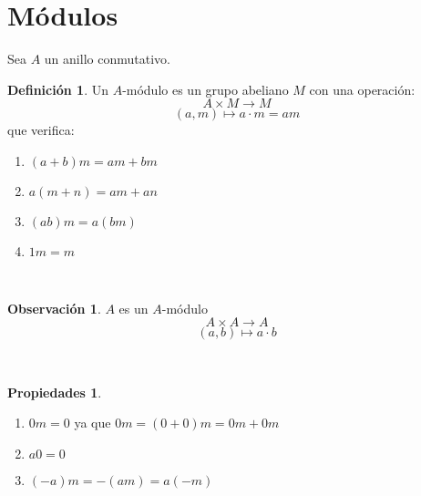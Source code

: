 \documentclass{article}
\theoremstyle{theorem-style}  %
\theoremstyle{definition}
\newtheorem{definition}{Definición}[section]
\newtheorem*{observation}{Observación} %
\newtheorem*{properties}{Propiedades}
\theoremstyle{example-style}
\begin{document}
\maketitle



\newpage
\tableofcontents
\newpage


\section{Módulos}
	Sea $A$ un anillo conmutativo.
	\begin{definition}
        	Un $A$-módulo  es un grupo abeliano $M$ con una operación:
        	\[A\times M\longrightarrow M \]
        	\[(a,m) \longmapsto a\cdot m =am\]
        	que verifica:
        	\begin{enumerate}[\hspace{1cm}i)]
        		\item $(a+b)m = am+bm$
        		\item $a(m+n)=am+an$
        		\item $(ab)m = a(bm)$
        		\item $1m=m$
        	\end{enumerate}
	\end{definition}
	\ 

	\begin{observation}
	    	$A$ es un $A$-módulo
	    	\[A\times A\longrightarrow A \]
	    	\[(a,b) \longmapsto a\cdot b\]
	\end{observation}
	\ 

	\begin{properties}
		\
	    	\begin{enumerate}
	    		\item $0m=0$ ya que $0m=(0+0)m=0m+0m$
	    		\item $a0=0$
	    		\item $(-a)m=-(am)=a(-m)$
		\end{enumerate}
	\end{properties}
	\ 
\end{document}

